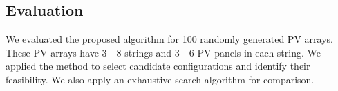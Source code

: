 \documentclass[conference]{IEEEtran}
\begin{document}

\subsection{Evaluation}
We evaluated the proposed algorithm for 100 randomly generated PV arrays.  
These PV arrays have 3 - 8 strings and 3 - 6 PV panels in each string. 
We applied the method\cite{orozco2016optimized} to select candidate configurations and identify their feasibility. 
We also apply an exhaustive search algorithm for comparison. 
\end{document}
